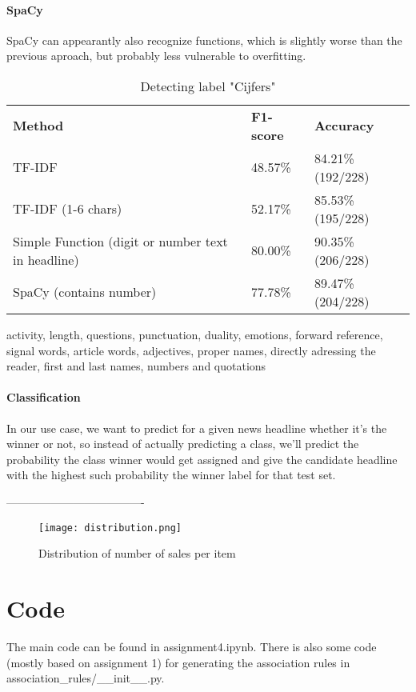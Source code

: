 \documentclass{article}
\begin{document}
\paragraph{SpaCy} SpaCy can appearantly also recognize functions, which is slightly worse than the previous aproach, but probably less vulnerable to overfitting.

\begin{table}[]
\begin{tabular}{lll}
\textbf{Method}                                    & \textbf{F1-score} & \textbf{Accuracy} \\
TF-IDF                                             & 48.57\%           & 84.21\% (192/228) \\
TF-IDF (1-6 chars)                                 & 52.17\%           & 85.53\% (195/228) \\
Simple Function (digit or number text in headline) & 80.00\%           & 90.35\% (206/228) \\
SpaCy (contains number)                            & 77.78\%           & 89.47\% (204/228)
\end{tabular}
\caption{Detecting label "Cijfers"}
\label{tab:numbers}
\end{table}

activity, length, questions, punctuation, duality, emotions, forward reference, signal words, article words, adjectives, proper names, directly adressing the reader, first and last names, numbers and quotations

\paragraph{Classification}
 In our use case, we want to predict for a given news headline whether it's the winner or not, so instead of actually predicting a class, we'll predict the probability the class winner would get assigned and give the candidate headline with the highest such probability the winner label for that test set.




\clearpage


\clearpage

-------------------------------------

\begin{figure}[h!]
\centering
\texttt{[image: distribution.png]}
\caption{Distribution of number of sales per item}
\label{fig:distribution}
\end{figure}

\section{Code}
The main code can be found in assignment4.ipynb. There is also some code (mostly based on assignment 1) for generating the association rules in association\_rules/\_\_init\_\_.py.
\end{document}

